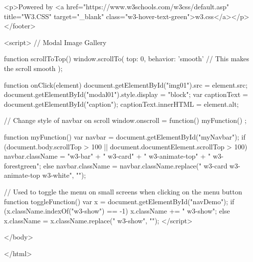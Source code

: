         <p>Powered by <a href="https://www.w3schools.com/w3css/default.asp" title="W3.CSS" target="_blank" class="w3-hover-text-green">w3.css</a></p>
    </footer>

    <script>
        // Modal Image Gallery
 
        function scrollToTop() {
            window.scrollTo({
                top: 0,
                behavior: 'smooth' // This makes the scroll smooth
            });
        }
    
        function onClick(element) {
            document.getElementById("img01").src = element.src;
            document.getElementById("modal01").style.display = "block";
            var captionText = document.getElementById("caption");
            captionText.innerHTML = element.alt;
        }

        // Change style of navbar on scroll
        window.onscroll = function() {
            myFunction()
        };

        function myFunction() {
            var navbar = document.getElementById("myNavbar");
            if (document.body.scrollTop > 100 || document.documentElement.scrollTop > 100) {
                navbar.className = "w3-bar" + " w3-card" + " w3-animate-top" + " w3-forestgreen";
            } else {
                navbar.className = navbar.className.replace(" w3-card w3-animate-top w3-white", "");
            }
        }

        // Used to toggle the menu on small screens when clicking on the menu button
        function toggleFunction() {
            var x = document.getElementById("navDemo");
            if (x.className.indexOf("w3-show") == -1) {
                x.className += " w3-show";
            } else {
                x.className = x.className.replace(" w3-show", "");
            }
        }
    </script>

</body>

</html>